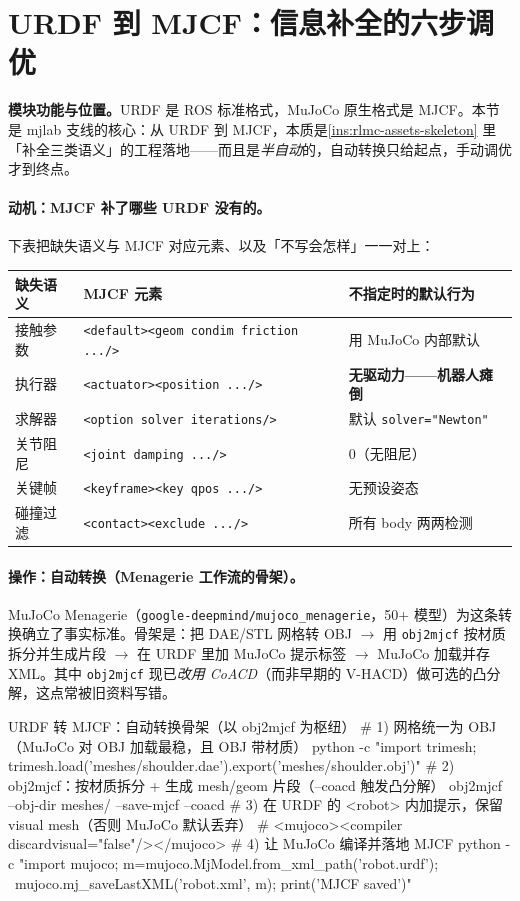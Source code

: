 \section{URDF 到 MJCF：信息补全的六步调优}
\label{sec:rlmc-assets-mjcf}

\textbf{模块功能与位置。}URDF 是 ROS 标准格式，MuJoCo 原生格式是 MJCF。本节是 mjlab 支线的核心：从 URDF 到 MJCF，本质是\cref{ins:rlmc-assets-skeleton} 里「补全三类语义」的工程落地——而且是\emph{半自动}的，自动转换只给起点，手动调优才到终点。

\paragraph{动机：MJCF 补了哪些 URDF 没有的。}下表把缺失语义与 MJCF 对应元素、以及「不写会怎样」一一对上：

\begin{center}
\small
\begin{tabular}{@{}lll@{}}
\toprule
缺失语义 & MJCF 元素 & 不指定时的默认行为 \\
\midrule
接触参数 & \texttt{<default><geom condim friction .../>} & 用 MuJoCo 内部默认 \\
执行器 & \texttt{<actuator><position .../>} & \textbf{无驱动力——机器人瘫倒} \\
求解器 & \texttt{<option solver iterations/>} & 默认 \texttt{solver="Newton"} \\
关节阻尼 & \texttt{<joint damping .../>} & 0（无阻尼） \\
关键帧 & \texttt{<keyframe><key qpos .../>} & 无预设姿态 \\
碰撞过滤 & \texttt{<contact><exclude .../>} & 所有 body 两两检测 \\
\bottomrule
\end{tabular}
\end{center}

\paragraph{操作：自动转换（Menagerie 工作流的骨架）。}MuJoCo Menagerie（\texttt{google-deepmind/mujoco\_menagerie}，50+ 模型）为这条转换确立了事实标准。骨架是：把 DAE/STL 网格转 OBJ $\to$ 用 \texttt{obj2mjcf} 按材质拆分并生成片段 $\to$ 在 URDF 里加 MuJoCo 提示标签 $\to$ MuJoCo 加载并存 XML。其中 \texttt{obj2mjcf} 现已\emph{改用 CoACD}（而非早期的 V-HACD）做可选的凸分解，这点常被旧资料写错。

\begin{codebox}[bash]{URDF 转 MJCF：自动转换骨架（以 obj2mjcf 为枢纽）}
# 1) 网格统一为 OBJ（MuJoCo 对 OBJ 加载最稳，且 OBJ 带材质）
python -c "import trimesh; trimesh.load('meshes/shoulder.dae').export('meshes/shoulder.obj')"
# 2) obj2mjcf：按材质拆分 + 生成 mesh/geom 片段（--coacd 触发凸分解）
obj2mjcf --obj-dir meshes/ --save-mjcf --coacd
# 3) 在 URDF 的 <robot> 内加提示，保留 visual mesh（否则 MuJoCo 默认丢弃）
#    <mujoco><compiler discardvisual="false"/></mujoco>
# 4) 让 MuJoCo 编译并落地 MJCF
python -c "import mujoco; m=mujoco.MjModel.from_xml_path('robot.urdf'); \
mujoco.mj_saveLastXML('robot.xml', m); print('MJCF saved')"
\end{codebox}

